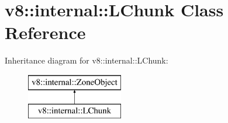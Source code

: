 \hypertarget{classv8_1_1internal_1_1_l_chunk}{}\section{v8\+:\+:internal\+:\+:L\+Chunk Class Reference}
\label{classv8_1_1internal_1_1_l_chunk}
Inheritance diagram for v8\+:\+:internal\+:\+:L\+Chunk\+:\begin{figure}[H]
\begin{center}
\leavevmode
\includegraphics[height=2.000000cm]{classv8_1_1internal_1_1_l_chunk}
\end{center}
\end{figure}

